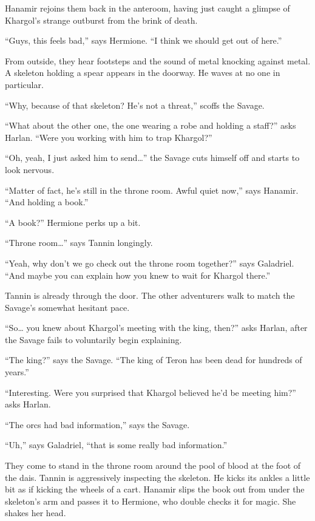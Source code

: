 \documentclass[smalldemyvopaper,11pt,twoside,onecolumn,openright,extrafontsizes]{memoir}
\begin{document}
Hanamir rejoins them back in the anteroom, having just caught a glimpse
of Khargol's strange outburst from the brink of death.

``Guys, this feels bad,'' says Hermione. ``I think we should get out of
here.''

From outside, they hear footsteps and the sound of metal knocking
against metal. A skeleton holding a spear appears in the doorway. He
waves at no one in particular.

``Why, because of that skeleton? He's not a threat,'' scoffs the Savage.

``What about the other one, the one wearing a robe and holding a
staff?'' asks Harlan. ``Were you working with him to trap Khargol?''

``Oh, yeah, I just asked him to send\ldots{}'' the Savage cuts himself
off and starts to look nervous.

``Matter of fact, he's still in the throne room. Awful quiet now,'' says
Hanamir. ``And holding a book.''

``A book?'' Hermione perks up a bit.

``Throne room\ldots{}'' says Tannin longingly.

``Yeah, why don't we go check out the throne room together?'' says
Galadriel. ``And maybe you can explain how you knew to wait for Khargol
there.''

Tannin is already through the door. The other adventurers walk to match
the Savage's somewhat hesitant pace.

``So\ldots{} you knew about Khargol's meeting with the king, then?''
asks Harlan, after the Savage fails to voluntarily begin explaining.

``The king?'' says the Savage. ``The king of Teron has been dead for
hundreds of years.''

``Interesting. Were you surprised that Khargol believed he'd be meeting
him?'' asks Harlan.

``The orcs had bad information,'' says the Savage.

``Uh,'' says Galadriel, ``that is some really bad information.''

They come to stand in the throne room around the pool of blood at the
foot of the dais. Tannin is aggressively inspecting the skeleton. He
kicks its ankles a little bit as if kicking the wheels of a cart.
Hanamir slips the book out from under the skeleton's arm and passes it
to Hermione, who double checks it for magic. She shakes her head.
\end{document}
